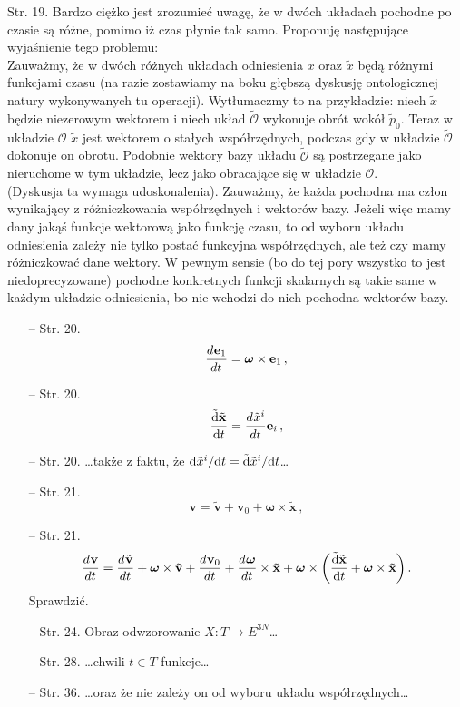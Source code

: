 \documentclass[a4paper,11pt]{article}
\begin{document}
\start {}

\start Str. 19. Bardzo ciężko jest zrozumieć uwagę, że w dwóch układach pochodne po czasie są różne, pomimo iż czas płynie tak samo. Proponuję następujące wyjaśnienie tego problemu: \\
Zauważmy, że w dwóch różnych układach odniesienia $x$ oraz
$\tilde{ x }$ będą różnymi funkcjami czasu (na razie zostawiamy na
boku głębszą dyskusję ontologicznej natury wykonywanych tu operacji).
Wytłumaczmy to na przykładzie: niech $\tilde{ x }$ będzie niezerowym
wektorem i niech układ $\tilde{ \mathcal{ O } }$ wykonuje obrót wokół
$\tilde{ p }_{ 0 }$. Teraz w układzie $\mathcal{ O }$ $\tilde{ x }$
jest wektorem o stałych współrzędnych, podczas gdy w układzie
$\tilde{ \mathcal{ O } }$ dokonuje on obrotu. Podobnie wektory bazy
układu $\tilde{ \mathcal{ O } }$ są postrzegane jako nieruchome w tym
układzie, lecz jako obracające się w
układzie $\mathcal{ O }$. \\
(Dyskusja ta wymaga udoskonalenia). Zauważmy, że każda pochodna ma
człon wynikający z różniczkowania współrzędnych i wektorów bazy.
Jeżeli więc mamy dany jakąś funkcje wektorową jako funkcję czasu, to
od wyboru układu odniesienia zależy nie tylko postać funkcyjna
współrzędnych, ale też czy mamy różniczkować dane wektory. W pewnym
sensie (bo do tej pory wszystko to jest niedoprecyzowane) pochodne
konkretnych funkcji skalarnych są takie same w każdym układzie
odniesienia, bo nie wchodzi do nich pochodna wektorów bazy.



\begin{itemize}
\item[--] Str. 20.
  $$\frac{ d^{  } {  \mathbf{ e }_{ 1 }  } }{ d {  t  }^{  } } = \boldsymbol{ \omega } \times
  \bold{ e }_{ 1 } \, ,$$
\item[--] Str. 20.
  $$\frac{ \tilde{ \mathrm{d} } \tilde{ \mathbf{ x } } }{ \mathrm{d} t } = \frac{ d^{  } { 
    \tilde{ x }^{ i } } }{ d {  t  }^{  } } \mathbf{ e }_{ i } \, ,$$
\item[--] Str. 20. \ldots także z faktu, że
  $\mathrm{d} \tilde{ x }^{ i } / \mathrm{d} t = \tilde{ \mathrm{d} } \tilde{ x
  }^{ i } / \mathrm{d} t$\ldots
\item[--] Str. 21.
  $$\mathbf{ v } = \tilde{ \mathbf{ v } } + \mathbf{ v }_{ 0 } +
  \boldsymbol{ \omega } \times \tilde{ \mathbf{ x } } \, ,$$
\item[--] Str. 21.
  $$\frac{ d^{  } {  \mathbf{ v }  } }{ d {  t  }^{  } } = \frac{ d^{  } {  \tilde{ \mathbf{ v } }  } }{ d {  t  }^{  } }
  + \boldsymbol{ \omega } \times \tilde{ \mathbf{ v } } + \frac{ d^{  } { 
    \mathbf{ v }_{ 0 }  } }{ d {  t  }^{  } } + \frac{ d^{  } {  \boldsymbol{ \omega }  } }{ d {  t  }^{  } }
  \times \tilde{ \bold{ x } } + \boldsymbol{ \omega } \times \bigg(
  \frac{ \tilde{ \mathrm{d} } \tilde{ \bold{ x } } }{ \mathrm{d} t } +
  \boldsymbol{ \omega } \times \tilde{ \bold{ x } } \bigg) \, .$$
  Sprawdzić.
\item[--] Str. 24. Obraz odwzorowanie
  $X : T \rightarrow E^{ 3N }$\ldots
\item[--] Str. 28. \ldots chwili $t \in T$ funkcje\ldots
\item[--] Str. 36. \ldots oraz że nie zależy on od wyboru układu
  współrzędnych\ldots
\end{itemize}
\end{document}
